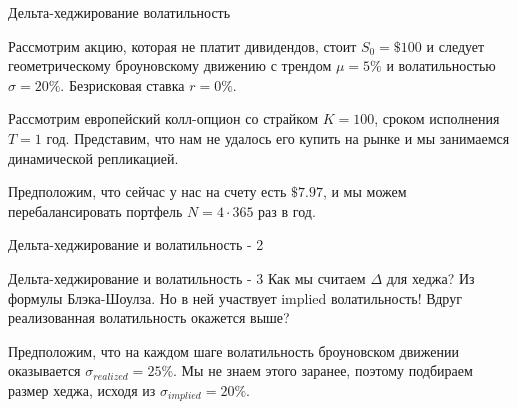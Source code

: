 \documentclass{beamer}
\begin{document}
\begin{frame}{Дельта-хеджирование волатильность}

\justify
Рассмотрим акцию, которая не платит дивидендов, стоит $S_0=\$100$ и следует 
геометрическому броуновскому движению с трендом $\mu=5\%$ и волатильностью
$\sigma=20\%$. Безрисковая ставка $r=0\%$.

\justify
Рассмотрим европейский колл-опцион со страйком $K=100$, сроком исполнения $T=1$ год. 
Представим, что нам не удалось его купить на рынке и мы занимаемся динамической 
репликацией.

\justify
Предположим, что сейчас у нас на счету есть $\$7.97$, и мы можем 
перебалансировать портфель $N=4\cdot365$ раз в год.

\end{frame}




\begin{frame}{Дельта-хеджирование и волатильность - 2}
\centering
{}
\end{frame}



\begin{frame}{Дельта-хеджирование и волатильность - 3}
\justify
Как мы считаем $\Delta$ для хеджа? Из формулы Блэка-Шоулза. Но в ней участвует 
\alert{implied} волатильность! Вдруг реализованная волатильность окажется выше?

\justify
Предположим, что на каждом шаге волатильность броуновском движении оказывается $\sigma_{realized}=25\%$. Мы не знаем этого заранее, поэтому подбираем размер хеджа,
исходя из $\sigma_{implied}=20\%$. 
\end{frame}
\end{document}
